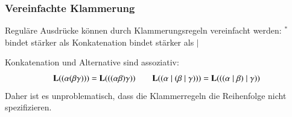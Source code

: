 \documentclass[onlymath]{beamer}
\begin{document}
\begin{frame}\frametitle{Vereinfachte Klammerung}

Reguläre Ausdrücke können durch Klammerungsregeln vereinfacht werden:
\alert{${}^*$ bindet stärker als Konkatenation bindet stärker als $\mid$}
\medskip

\pause

Konkatenation und Alternative sind assoziativ:
\[
\textbf{\textcolor{black}{L}}((\alpha(\beta\gamma))) = \textbf{\textcolor{black}{L}}(((\alpha\beta)\gamma)) \qquad
\textbf{\textcolor{black}{L}}((\alpha\mid(\beta\mid\gamma))) = \textbf{\textcolor{black}{L}}(((\alpha\mid\beta)\mid\gamma))
\]
Daher ist es unproblematisch, dass die Klammerregeln die Reihenfolge nicht spezifizieren.


\end{frame}
\end{document}
